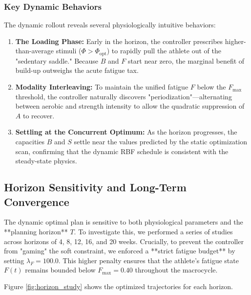 \subsubsection{Key Dynamic Behaviors}

The dynamic rollout reveals several physiologically intuitive behaviors:
\begin{enumerate}
    \item \textbf{The Loading Phase:} Early in the horizon, the controller prescribes higher-than-average stimuli ($\Phi > \Phi_{\text{opt}}$) to rapidly pull the athlete out of the "sedentary saddle." Because $B$ and $F$ start near zero, the marginal benefit of build-up outweighs the acute fatigue tax.
    \item \textbf{Modality Interleaving:} To maintain the unified fatigue $F$ below the $F_{\text{max}}$ threshold, the controller naturally discovers "periodization"—alternating between aerobic and strength intensity to allow the quadratic suppression of $A$ to recover.
    \item \textbf{Settling at the Concurrent Optimum:} As the horizon progresses, the capacities $B$ and $S$ settle near the values predicted by the static optimization scan, confirming that the dynamic RBF schedule is consistent with the steady-state physics.
\end{enumerate}

\subsection{Horizon Sensitivity and Long-Term Convergence}

The dynamic optimal plan is sensitive to both physiological parameters and the **planning horizon** $T$. To investigate this, we performed a series of studies across horizons of 4, 8, 12, 16, and 20 weeks. Crucially, to prevent the controller from "gaming" the soft constraint, we enforced a **strict fatigue budget** by setting $\lambda_F = 100.0$. This higher penalty ensures that the athlete's fatigue state $F(t)$ remains bounded below $F_{\text{max}} = 0.40$ throughout the macrocycle.

Figure \ref{fig:horizon_study} shows the optimized trajectories for each horizon.

